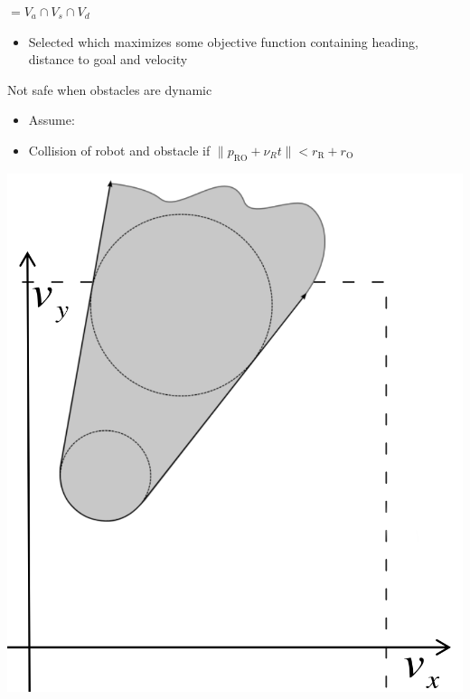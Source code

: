 \begin{itemize}
\begin{itemize}
\begin{itemize}
                \end{itemize}
             $= V_a \cap V_s \cap V_d$
                \begin{itemize}
                    \item Selected which maximizes some objective function containing heading, distance to goal and velocity
                \end{itemize}
            \icon Not safe when obstacles are dynamic
        \end{itemize}
        \begin{minipage}[b]{0.5\linewidth}
            \raggedright
            \begin{itemize}
                \item Assume:
                \item Collision of robot and obstacle if $\lVert p_\text{RO} + \nu_R t \rVert < r_\text{R} + r_\text{O}$
            \end{itemize}
        \end{minipage}
        \begin{minipage}[b]{0.45\linewidth}
            \includegraphics[width=0.97\linewidth]{./Figures/06_VO.png}

\end{minipage}
\end{itemize}
